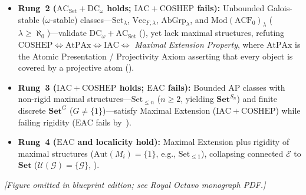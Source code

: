 \begin{itemize}
  \item \textbf{Rung~2 ($\mathrm{AC}_{\mathrm{Set}} + \mathrm{DC}_\omega$ holds; $\mathrm{IAC} + \mathrm{COSHEP}$ fails):} Unbounded Galois-stable ($\omega$-stable) classes---$\mathrm{Set}_\lambda$, $\mathrm{Vec}_{F, \lambda}$, $\mathrm{AbGrp}_\lambda$, and $\mathrm{Mod}(\mathrm{ACF}_0)_\lambda$ ($\lambda \ge \aleph_0$)---validate $\mathrm{DC}_\omega + \mathrm{AC}_{\mathrm{Set}}$ (\cite[Theorem~5.6, Corollary~7.1]{Kihara26}), yet lack maximal structures, refuting $\mathrm{COSHEP} \iff \mathrm{AtPAx} \iff \mathrm{IAC} \iff$ \emph{Maximal Extension Property}, where $\mathrm{AtPAx}$ is the Atomic Presentation / Projectivity Axiom asserting that every object is covered by a projective atom (\cite[Proposition~6.6 and Theorems~6.2, 6.7, and~6.8]{Kihara26}).
  \item \textbf{Rung~3 ($\mathrm{IAC} + \mathrm{COSHEP}$ holds; $\mathrm{EAC}$ fails):} Bounded $\mathrm{AP}$ classes with non-rigid maximal structures---$\mathrm{Set}_{\le n}$ ($n \ge 2$, yielding $\mathbf{Set}^{S_n}$) and finite discrete $\mathbf{Set}^G$ ($G \neq \{1\}$)---satisfy Maximal Extension ($\mathrm{IAC} + \mathrm{COSHEP}$) while failing rigidity ($\mathrm{EAC}$ fails by~\cite[Theorem~6.19]{Kihara26}).
  \item \textbf{Rung~4 ($\mathrm{EAC}$ and localicity hold):} Maximal Extension plus rigidity of maximal structures ($\mathrm{Aut}(M_i) = \{1\}$, e.g., $\mathrm{Set}_{\le 1}$), collapsing connected $\mathcal{E}$ to $\mathbf{Set}$ ($\mathcal{U}(\mathcal{G}) = \{\mathcal{G}\}$, \cite[Theorem~6.19]{Kihara26}).
\end{itemize}

\begin{center}\emph{[Figure omitted in blueprint edition; see Royal Octavo monograph PDF.]}\label{fig:kihara-choice-spectrum}\end{center}

